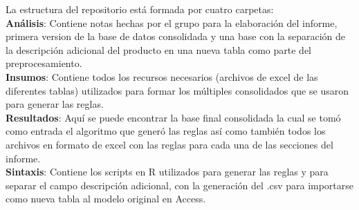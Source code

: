 \documentclass[]{article}
\begin{document}
	\noindent La estructura del repositorio está formada por cuatro carpetas:\\
	
	\textbf{Análisis}: Contiene notas hechas por el grupo para la elaboración del informe, primera version de la base de datos consolidada y una base con la separación de la descripción adicional del producto en una nueva tabla como parte del preprocesamiento.\\
	
	\textbf{Insumos}: Contiene todos los recursos necesarios (archivos de excel de las diferentes tablas) utilizados para formar los múltiples consolidados que se usaron para generar las reglas.\\
	
	\textbf{Resultados}: Aquí se puede encontrar la base final consolidada la cual se tomó como entrada el algoritmo que generó las reglas así como también todos los  archivos en formato de excel con las reglas para cada una de las secciones del informe.\\
	
	\textbf{Sintaxis}: Contiene los scripts en R utilizados para generar las reglas y para separar el campo descripción adicional, con la generación del .csv para importarse como nueva tabla al modelo original en Access.\\
	
	
	
	
	
\end{document}
